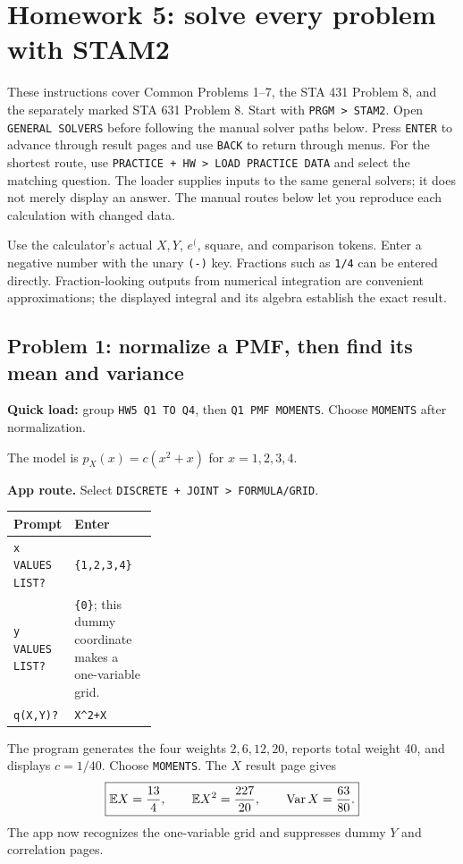 \section{Homework 5: solve every problem with STAM2}
\label{sec:hw5-app-walkthrough}
These instructions cover Common Problems 1--7, the STA 431 Problem 8, and the separately marked STA 631 Problem 8. Start with \texttt{PRGM > STAM2}. Open \texttt{GENERAL SOLVERS} before following the manual solver paths below. Press \texttt{ENTER} to advance through result pages and use \texttt{BACK} to return through menus. For the shortest route, use \texttt{PRACTICE + HW > LOAD PRACTICE DATA} and select the matching question. The loader supplies inputs to the same general solvers; it does not merely display an answer. The manual routes below let you reproduce each calculation with changed data.

Use the calculator's actual $X,Y$, $e^{(}$, square, and comparison tokens. Enter a negative number with the unary \texttt{(-)} key. Fractions such as \texttt{1/4} can be entered directly. Fraction-looking outputs from numerical integration are convenient approximations; the displayed integral and its algebra establish the exact result.

\subsection{Problem 1: normalize a PMF, then find its mean and variance}
\textbf{Quick load:} group \texttt{HW5 Q1 TO Q4}, then \texttt{Q1 PMF MOMENTS}. Choose \texttt{MOMENTS} after normalization.

The model is $p_X(x)=c(x^2+x)$ for $x=1,2,3,4$.

\textbf{App route.} Select \texttt{DISCRETE + JOINT > FORMULA/GRID}.
\begin{center}
\begin{tabularx}{\linewidth}{@{}p{0.32\linewidth}X@{}}
\toprule Prompt & Enter\\\midrule
\texttt{x VALUES LIST?} & \texttt{\{1,2,3,4\}}\\
\texttt{y VALUES LIST?} & \texttt{\{0\}}; this dummy coordinate makes a one-variable grid.\\
\texttt{q(X,Y)?} & \texttt{X\^{}2+X}\\\bottomrule
\end{tabularx}
\end{center}
The program generates the four weights $2,6,12,20$, reports total weight 40, and displays $c=1/40$. Choose \texttt{MOMENTS}. The $X$ result page gives
\[
\boxed{\mathbb E X=\frac{13}{4},\qquad \mathbb E X^2=\frac{227}{20},\qquad \operatorname{Var} X=\frac{63}{80}.}
\]
The app now recognizes the one-variable grid and suppresses dummy $Y$ and correlation pages.

